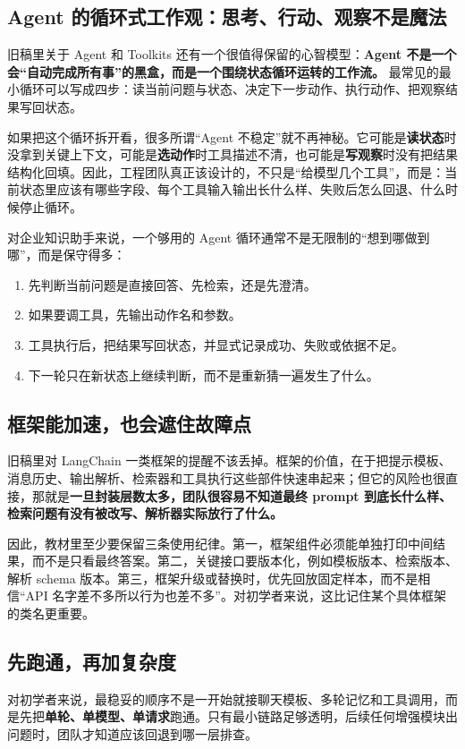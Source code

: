 \subsection{Agent 的循环式工作观：思考、行动、观察不是魔法}
旧稿里关于 Agent 和 Toolkits 还有一个很值得保留的心智模型：\textbf{Agent 不是一个会“自动完成所有事”的黑盒，而是一个围绕状态循环运转的工作流。} 最常见的最小循环可以写成四步：读当前问题与状态、决定下一步动作、执行动作、把观察结果写回状态。

如果把这个循环拆开看，很多所谓“Agent 不稳定”就不再神秘。它可能是\textbf{读状态}时没拿到关键上下文，可能是\textbf{选动作}时工具描述不清，也可能是\textbf{写观察}时没有把结果结构化回填。因此，工程团队真正该设计的，不只是“给模型几个工具”，而是：当前状态里应该有哪些字段、每个工具输入输出长什么样、失败后怎么回退、什么时候停止循环。

对企业知识助手来说，一个够用的 Agent 循环通常不是无限制的“想到哪做到哪”，而是保守得多：
\begin{enumerate}
  \item 先判断当前问题是直接回答、先检索，还是先澄清。
  \item 如果要调工具，先输出动作名和参数。
  \item 工具执行后，把结果写回状态，并显式记录成功、失败或依据不足。
  \item 下一轮只在新状态上继续判断，而不是重新猜一遍发生了什么。
\end{enumerate}

\subsection{框架能加速，也会遮住故障点}
旧稿里对 LangChain 一类框架的提醒不该丢掉。框架的价值，在于把提示模板、消息历史、输出解析、检索器和工具执行这些部件快速串起来；但它的风险也很直接，那就是\textbf{一旦封装层数太多，团队很容易不知道最终 prompt 到底长什么样、检索问题有没有被改写、解析器实际放行了什么。}

因此，教材里至少要保留三条使用纪律。第一，框架组件必须能单独打印中间结果，而不是只看最终答案。第二，关键接口要版本化，例如模板版本、检索版本、解析 schema 版本。第三，框架升级或替换时，优先回放固定样本，而不是相信“API 名字差不多所以行为也差不多”。对初学者来说，这比记住某个具体框架的类名更重要。

\subsection{先跑通，再加复杂度}
对初学者来说，最稳妥的顺序不是一开始就接聊天模板、多轮记忆和工具调用，而是先把\textbf{单轮、单模型、单请求}跑通。只有最小链路足够透明，后续任何增强模块出问题时，团队才知道应该回退到哪一层排查。

